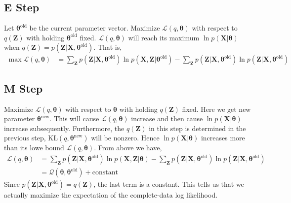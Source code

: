 \documentclass{article}
\begin{document}
        \subsection{E Step}
        Let $\boldsymbol{\theta}^{\mathrm{old}}$ be the current parameter vector. Maximize $\mathcal{L}(q,\boldsymbol{\theta})$ with respect to $q(\mathbf{Z})$ with holding $\boldsymbol{\theta}^{\mathrm{old}}$ fixed. $\mathcal{L}(q,\boldsymbol{\theta})$ will reach its maximum $\ln p(\mathbf{X}|\boldsymbol{\theta})$ when $q(\mathbf{Z})=p(\mathbf{Z}|\mathbf{X},\boldsymbol{\theta}^\mathrm{old})$. That is,
        \begin{align*}
            \max\mathcal{L}(q,\boldsymbol{\theta})&=\sum_{\mathbf{Z}}p(\mathbf{Z}|\mathbf{X},\boldsymbol{\theta}^{\mathrm{old}})\ln p(\mathbf{X},\mathbf{Z}|\boldsymbol{\theta}^\mathrm{old}) - \sum_{\mathbf{Z}}p(\mathbf{Z}|\mathbf{X},\boldsymbol{\theta}^{\mathrm{old}})\ln p(\mathbf{Z}|\mathbf{X},\boldsymbol{\theta}^{\mathrm{old}})
        \end{align*}
        \subsection{M Step}
        Maximize $\mathcal{L}(q,\boldsymbol{\theta})$ with respect to $\boldsymbol{\theta}$ with holding $q(\mathbf{Z})$ fixed. 
        Here we get new parameter $\boldsymbol{\theta}^{\mathrm{new}}$. This will cause $\mathcal{L}(q,\boldsymbol{\theta})$ increase and then cause $\ln p(\mathbf{X}|\boldsymbol{\theta})$ increase subsequently. Furthermore, the $q(\mathbf{Z})$ in this step is determined in the previous step, $\mathrm{KL}(q,\boldsymbol{\theta}^{\mathrm{new}})$ will be nonzero. Hence $\ln p(\mathbf{X}|\boldsymbol{\theta})$ increases more than its lowe bound $\mathcal{L}(q,\boldsymbol{\theta})$. From above we have,
        \begin{align*}
            \mathcal{L}(q,\boldsymbol{\theta})&=\sum_{\mathbf{Z}}p(\mathbf{Z}|\mathbf{X},\boldsymbol{\theta}^\mathrm{old})\ln p(\mathbf{X},\mathbf{Z}|\boldsymbol{\theta})-\sum_{\mathbf{Z}}p(\mathbf{Z}|\mathbf{X},\boldsymbol{\theta}^\mathrm{old})\ln p(\mathbf{Z}|\mathbf{X},\boldsymbol{\theta}^\mathrm{old})\\
            &=\mathcal{Q}(\boldsymbol{\theta},\boldsymbol{\theta}^\mathrm{old}) + \mathrm{constant}
        \end{align*}
        Since $p(\mathbf{Z}|\mathbf{X},\boldsymbol{\theta}^\mathrm{old}) = q(\mathbf{Z})$, the last term is a constant. This tells us that we actually maximize the expectation of the complete-data log likelihood.
\end{document}
